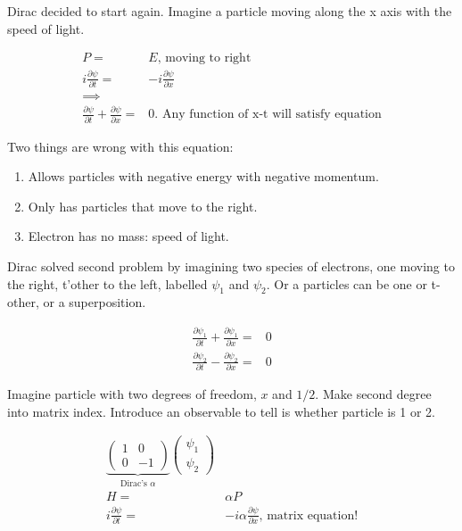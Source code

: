 \documentclass[]{article}
\begin{document}
Dirac decided to start again. Imagine a particle moving along the x axis with the speed of light.

\begin{align*}
P =& E \text{, moving to right}\\
i \frac{\partial \psi}{\partial t} =& -i \frac{\partial \psi}{\partial x}\\
\implies&\\
\frac{\partial \psi}{\partial t} + \frac{\partial \psi}{\partial x}=&0\text{. Any function of x-t will satisfy equation}
\end{align*}

Two things are wrong with this equation:
\begin{enumerate}
	\item Allows particles with negative energy with negative momentum.
	\item Only has particles that move to the right.
	\item Electron has no mass: speed of light.
\end{enumerate}

Dirac solved second problem by imagining two species of electrons, one moving to the right, t'other to the left, labelled $\psi_1$ and $\psi_2$. Or a particles can be one or t-other, or a superposition.

\begin{align*}
\frac{\partial \psi_1}{\partial t} + \frac{\partial \psi_1}{\partial x}=&0\\
\frac{\partial \psi_2}{\partial t} - \frac{\partial \psi_2}{\partial x}=&0
\end{align*}

Imagine particle with two degrees of freedom, $x$ and $1/2$. Make second degree into matrix index. Introduce an observable to tell is whether particle is 1 or 2.

\begin{align*}
\underbrace{
	\begin{pmatrix}
		1 & 0\\
		0 & -1
	\end{pmatrix}
}_\text{Dirac's $\alpha$}
\begin{pmatrix}
	\psi_1\\
	\psi_2
\end{pmatrix}\\
H =& \alpha P\\
i\frac{\partial \psi}{\partial t} =& -i \alpha \frac{\partial \psi}{\partial x} \text{, matrix equation!}
\end{align*}
\end{document}
